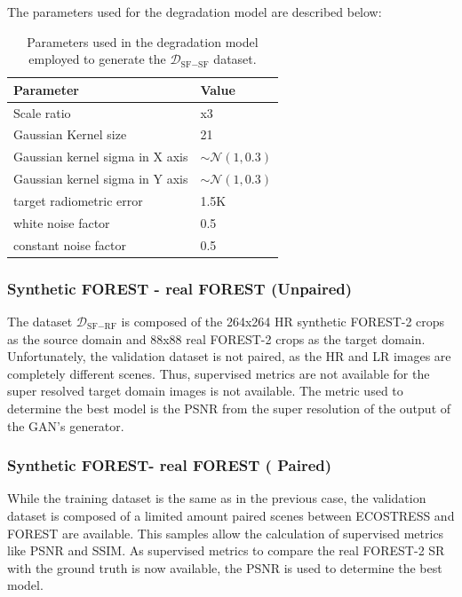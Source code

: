     The parameters used for the degradation model are described below:

    \begin{table}[H]
        \centering
        \begin{tabular}{l|l}
        Parameter & Value \\ \hline
        Scale ratio & x3 \\ 
        Gaussian Kernel size & 21 \\ 
        Gaussian kernel sigma in X axis &  $\sim \mathcal{N}(1,0.3)$  \\ 
        Gaussian kernel sigma in Y axis &  $\sim \mathcal{N}(1,0.3)$  \\ 
        target radiometric error & 1.5K \\ 
        white noise factor & 0.5 \\ 
        constant noise factor & 0.5 \\ 
        \end{tabular}
        \caption{Parameters used in the degradation model employed to generate the $\mathcal{D}_{\text{SF}-\text{SF}}$ dataset.}
        \label{tab:degradation_model_parameters}
    \end{table}

\subsubsection{Synthetic FOREST - real FOREST (Unpaired)}
    The dataset $\mathcal{D}_{\text{SF}-\text{RF}}$ is composed of the 264x264 HR synthetic FOREST-2 crops as the source domain and  88x88 real FOREST-2 crops as the target domain. 
    Unfortunately, the validation dataset is not paired, as the HR and LR images are completely different scenes.
    Thus, supervised metrics are not available for the super resolved target domain images is not available. 
    The metric used to determine the best model is the PSNR from the super resolution of the output of the GAN's generator.

\subsubsection{Synthetic FOREST- real FOREST ( Paired)}
    While the training dataset is the same as in the previous case, the validation dataset is composed of a limited amount paired scenes between ECOSTRESS and FOREST are available.
    This samples allow the calculation of supervised metrics like PSNR and SSIM. 
    As supervised metrics to compare the real FOREST-2 SR with the ground truth is now available, the PSNR is used to determine the best model.




\newpage